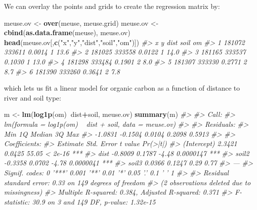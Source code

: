 \documentclass[graybox,natbib,nospthms,UStrade]{svmono}
\newenvironment{Shaded}{\begin{snugshade}}{\end{snugshade}}
\newcommand{\CommentTok}[1]{\textcolor[rgb]{0.37,0.37,0.37}{\textit{#1}}}
\newcommand{\KeywordTok}[1]{\textcolor[rgb]{0.27,0.27,0.27}{\textbf{#1}}}
\newcommand{\NormalTok}[1]{#1}
\newcommand{\OperatorTok}[1]{\textcolor[rgb]{0.43,0.43,0.43}{\textbf{#1}}}
\newcommand{\StringTok}[1]{\textcolor[rgb]{0.5,0.5,0.5}{#1}}
\begin{document}
We can overlay the points and grids to create the regression matrix by:

\begin{Shaded}
\begin{Highlighting}[]
\NormalTok{meuse.ov <-}\StringTok{ }\KeywordTok{over}\NormalTok{(meuse, meuse.grid)}
\NormalTok{meuse.ov <-}\StringTok{ }\KeywordTok{cbind}\NormalTok{(}\KeywordTok{as.data.frame}\NormalTok{(meuse), meuse.ov)}
\KeywordTok{head}\NormalTok{(meuse.ov[,}\KeywordTok{c}\NormalTok{(}\StringTok{"x"}\NormalTok{,}\StringTok{"y"}\NormalTok{,}\StringTok{"dist"}\NormalTok{,}\StringTok{"soil"}\NormalTok{,}\StringTok{"om"}\NormalTok{)])}
\CommentTok{#>        x      y   dist soil   om}
\CommentTok{#> 1 181072 333611 0.0014    1 13.6}
\CommentTok{#> 2 181025 333558 0.0122    1 14.0}
\CommentTok{#> 3 181165 333537 0.1030    1 13.0}
\CommentTok{#> 4 181298 333484 0.1901    2  8.0}
\CommentTok{#> 5 181307 333330 0.2771    2  8.7}
\CommentTok{#> 6 181390 333260 0.3641    2  7.8}
\end{Highlighting}
\end{Shaded}

which lets us fit a linear model for organic carbon as a function
of distance to river and soil type:

\begin{Shaded}
\begin{Highlighting}[]
\NormalTok{m <-}\StringTok{ }\KeywordTok{lm}\NormalTok{(}\KeywordTok{log1p}\NormalTok{(om)}\OperatorTok{~}\NormalTok{dist}\OperatorTok{+}\NormalTok{soil, meuse.ov)}
\KeywordTok{summary}\NormalTok{(m)}
\CommentTok{#> }
\CommentTok{#> Call:}
\CommentTok{#> lm(formula = log1p(om) ~ dist + soil, data = meuse.ov)}
\CommentTok{#> }
\CommentTok{#> Residuals:}
\CommentTok{#>     Min      1Q  Median      3Q     Max }
\CommentTok{#> -1.0831 -0.1504  0.0104  0.2098  0.5913 }
\CommentTok{#> }
\CommentTok{#> Coefficients:}
\CommentTok{#>             Estimate Std. Error t value  Pr(>|t|)    }
\CommentTok{#> (Intercept)   2.3421     0.0425   55.05   < 2e-16 ***}
\CommentTok{#> dist         -0.8009     0.1787   -4.48 0.0000147 ***}
\CommentTok{#> soil2        -0.3358     0.0702   -4.78 0.0000041 ***}
\CommentTok{#> soil3         0.0366     0.1247    0.29      0.77    }
\CommentTok{#> ---}
\CommentTok{#> Signif. codes:  0 '***' 0.001 '**' 0.01 '*' 0.05 '.' 0.1 ' ' 1}
\CommentTok{#> }
\CommentTok{#> Residual standard error: 0.33 on 149 degrees of freedom}
\CommentTok{#>   (2 observations deleted due to missingness)}
\CommentTok{#> Multiple R-squared:  0.384,  Adjusted R-squared:  0.371 }
\CommentTok{#> F-statistic: 30.9 on 3 and 149 DF,  p-value: 1.32e-15}
\end{Highlighting}
\end{Shaded}
\end{document}
